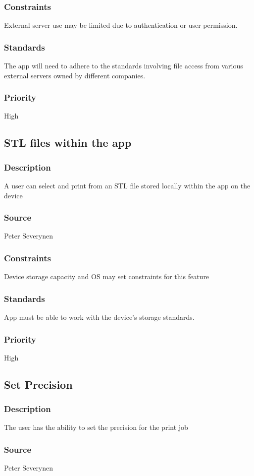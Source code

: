 \subsubsection{Constraints}
External server use may be limited due to authentication or user permission.
\subsubsection{Standards}
The app will need to adhere to the standards involving file access from various external servers owned by different companies.
\subsubsection{Priority}
High
\subsection{STL files within the app}
\subsubsection{Description}
A user can select and print from an STL file stored locally within the app on the device
\subsubsection{Source}
Peter Severynen
\subsubsection{Constraints}
Device storage capacity and OS may set constraints for this feature
\subsubsection{Standards}
App must be able to work with the device's storage standards.
\subsubsection{Priority}
High
\subsection{Set Precision}
\subsubsection{Description}
The user has the ability to set the precision for the print job
\subsubsection{Source}
Peter Severynen
